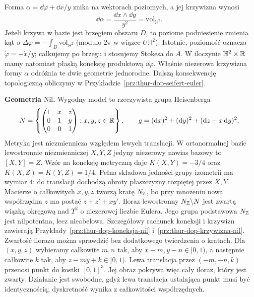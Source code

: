 \begin{przyklad}
Forma $\alpha=\dd\varphi+\dd x/y$ znika na
wektorach poziomych, a jej krzywizna wynosi
\[
 \dd\alpha=\frac{\dd x\wedge\dd y}{y^2}
     =\mathrm{vol}_{\mathbb H^2}.
\]
Jeżeli krzywa w bazie jest brzegiem obszaru $D$,
to poziome podniesienie zmienia kąt o
$\Delta\varphi=-\int_D\mathrm{vol}_{\mathbb H^2}$
(modulo $2\pi$ w wiązce $U\mathbb H^2$).
Istotnie, poziomość oznacza $\dot\varphi=-\dot x/y$;
całkujemy po brzegu i stosujemy Stokesa do $A$.
W iloczynie $\mathbb H^2\times\mathbb{R}$ mamy natomiast
płaską koneksję produktową $\dd\varphi$.
Właśnie niezerowa krzywizna formy $\alpha$ odróżnia
te dwie geometrie jednorodne. Dalszą konsekwencję
topologiczną obliczymy w
Przykładzie~\ref{prz:thur-dop-seifert-euler}.
\end{przyklad}

\textbf{Geometria $\mathrm{Nil}$.}
Wygodny model to rzeczywista grupa Heisenberga
\[
 N=\left\{\begin{pmatrix}1&x&z\\0&1&y\\0&0&1\end{pmatrix}
 :x,y,z\in\mathbb{R}\right\},
 \qquad
 g=(\mathrm d x)^2+(\mathrm d y)^2+(\mathrm d z-x\,\mathrm d y)^2.
\]
Metryka jest niezmiennicza względem lewych translacji.
W ortonormalnej bazie lewostronnie niezmienniczej $X,Y,Z$
jedyny niezerowy nawias bazowy to $[X,Y]=Z$. Wzór na koneksję
metryczną daje $K(X,Y)=-3/4$ oraz
$K(X,Z)=K(Y,Z)=1/4$. Pełna składowa jedności grupy
izometrii ma wymiar $4$: do translacji dochodzą obroty
płaszczyzny rozpiętej przez $X,Y$.
Macierze o całkowitych $x,y,z$ tworzą kratę $N_{\mathbb{Z}}$,
bo przy mnożeniu nowa współrzędna $z$ ma postać $z+z'+xy'$.
Iloraz lewostronny $N_{\mathbb{Z}}\backslash N$ jest zwartą wiązką
okręgową nad $T^2$
o niezerowej liczbie Eulera. Jego grupa podstawowa
$N_{\mathbb{Z}}$ jest nilpotentna, lecz nieabelowa.
Szczegółowy rachunek koneksji i krzywizn zawierają
Przykłady~\ref{prz:thur-dop-koneksja-nil}
i~\ref{prz:thur-dop-krzywizna-nil}.
Zwartość ilorazu można sprawdzić bez dodatkowego twierdzenia
o kratach. Dla $(x,y,z)$ wybieramy całkowite $m,n$ tak,
aby $x-m,y-n\in[0,1)$, a następnie całkowite $k$ tak,
aby $z-my+k\in[0,1)$. Lewa translacja przez $(-m,-n,k)$
przenosi punkt do kostki $[0,1]^3$. Jej obraz pokrywa więc
cały iloraz, który jest zwarty. Działanie jest swobodne,
gdyż lewa translacja ustalająca punkt musi być identycznością;
dyskretność wynika z całkowitości współrzędnych.


